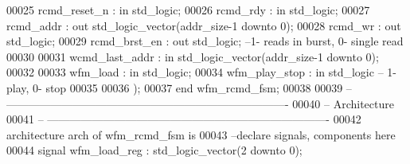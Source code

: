 \begin{DoxyCode}
00025         \textcolor{vhdlchar}{rcmd_reset_n}            \textcolor{vhdlchar}{:} \textcolor{keywordflow}{in} \textcolor{comment}{std\_logic};
00026         \textcolor{vhdlchar}{rcmd_rdy}                    \textcolor{vhdlchar}{:} \textcolor{keywordflow}{in} \textcolor{comment}{std\_logic};
00027         \textcolor{vhdlchar}{rcmd_addr}               \textcolor{vhdlchar}{:} \textcolor{keywordflow}{out} \textcolor{comment}{std\_logic\_vector}\textcolor{vhdlchar}{(}\textcolor{vhdlchar}{addr_size}\textcolor{vhdlchar}{-}\textcolor{vhdllogic}{}\textcolor{vhdllogic}{1} \textcolor{keywordflow}{downto} \textcolor{vhdllogic}{}\textcolor{vhdllogic}{0}\textcolor{vhdlchar}{)};
00028         \textcolor{vhdlchar}{rcmd_wr}                 \textcolor{vhdlchar}{:} \textcolor{keywordflow}{out} \textcolor{comment}{std\_logic};
00029         \textcolor{vhdlchar}{rcmd_brst_en}            \textcolor{vhdlchar}{:} \textcolor{keywordflow}{out} \textcolor{comment}{std\_logic};\textcolor{keyword}{ --1- reads in burst, 0- single read}
00030 
00031         \textcolor{vhdlchar}{wcmd_last_addr}          \textcolor{vhdlchar}{:} \textcolor{keywordflow}{in} \textcolor{comment}{std\_logic\_vector}\textcolor{vhdlchar}{(}\textcolor{vhdlchar}{addr_size}\textcolor{vhdlchar}{-}\textcolor{vhdllogic}{}\textcolor{vhdllogic}{1} \textcolor{keywordflow}{downto} \textcolor{vhdllogic}{}\textcolor{vhdllogic}{0}\textcolor{vhdlchar}{)};
00032  
00033         \textcolor{vhdlchar}{wfm_load}                    \textcolor{vhdlchar}{:} \textcolor{keywordflow}{in} \textcolor{comment}{std\_logic};
00034         \textcolor{vhdlchar}{wfm_play_stop}           \textcolor{vhdlchar}{:} \textcolor{keywordflow}{in} \textcolor{comment}{std\_logic}\textcolor{keyword}{ -- 1- play, 0- stop}
00035         
00036         \textcolor{vhdlchar}{)};
00037 \textcolor{keywordflow}{end} \textcolor{vhdlchar}{wfm\_rcmd\_fsm};
00038 
00039 \textcolor{keyword}{-- ----------------------------------------------------------------------------}
00040 \textcolor{keyword}{-- Architecture}
00041 \textcolor{keyword}{-- ----------------------------------------------------------------------------}
00042 \textcolor{keywordflow}{architecture} arch \textcolor{keywordflow}{of} wfm_rcmd_fsm is
00043 \textcolor{keyword}{--declare signals,  components here}
00044 \textcolor{keywordflow}{signal} \textcolor{vhdlchar}{wfm_load_reg} \textcolor{vhdlchar}{:} \textcolor{comment}{std\_logic\_vector}\textcolor{vhdlchar}{(}\textcolor{vhdllogic}{}\textcolor{vhdllogic}{2} \textcolor{keywordflow}{downto} \textcolor{vhdllogic}{}\textcolor{vhdllogic}{0}\textcolor{vhdlchar}{)};

\end{DoxyCode}
